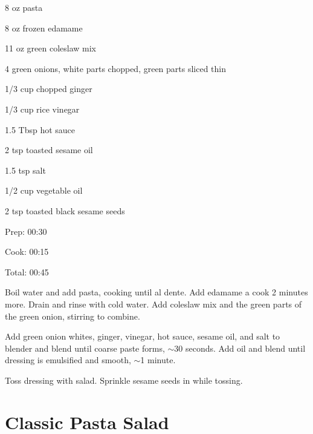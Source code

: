 \documentclass[oneside]{book}  %
\def\thisrecipe{}  %
\newcommand{\recipe}[1]{\section{#1}\def\thisrecipe{: #1}} %
\newcommand{\about}{$\sim$}
\begin{document}
\begin{IT}
  \begin{ingredients}
    \item[8 oz] pasta
    \item[8 oz] frozen edamame
    \item[11 oz] green coleslaw mix
    \item[4] green onions, white parts chopped, green parts sliced thin
    \item[1/3 cup] chopped ginger
    \item[1/3 cup] rice vinegar
    \item[1.5 Tbsp] hot sauce
    \item[2 tsp] toasted sesame oil
    \item[1.5 tsp] salt
    \item[1/2 cup] vegetable oil
    \item[2 tsp] toasted black sesame seeds
  \end{ingredients}

  \switchcolumn

  \begin{timeline}
    \item[Prep:]  00:30
    \item[Cook:]  00:15
    \item[Total:] 00:45
  \end{timeline}
\end{IT}

\begin{directions}
  \item Boil water and add pasta, cooking until al dente. Add edamame a cook 2
  minutes more. Drain and rinse with cold water. Add coleslaw mix and the green
  parts of the green onion, stirring to combine.

  \item Add green onion whites, ginger, vinegar, hot sauce, sesame oil, and salt
  to blender and blend until coarse paste forms, \about 30 seconds. Add oil
  and blend until dressing is emulsified and smooth, \about 1 minute.

  \item Toss dressing with salad. Sprinkle sesame seeds in while tossing.
\end{directions}
\recipe{Classic Pasta Salad} \label{recipe:classic_pasta_salad} %
 
\end{document}
